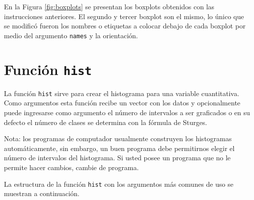 \documentclass[10pt,]{krantz}
\begin{document}
En la Figura \ref{fig:boxplots} se presentan los boxplots obtenidos con
las instrucciones anteriores. El segundo y tercer boxplot son el mismo,
lo único que se modificó fueron los nombres o etiquetas a colocar debajo
de cada boxplot por medio del argumento \texttt{names} y la orientación.

\section{\texorpdfstring{Función
\texttt{hist}}{Función hist}}\label{funcion-hist}

La función \texttt{hist} sirve para crear el histograma
 para una variable cuantitativa. Como
argumentos esta función recibe un vector con los datos y opcionalmente
puede ingresarse como argumento el número de intervalos a ser graficados
o en su defecto el número de clases se determina con la fórmula de
Sturges.

Nota: los programas de computador usualmente construyen los histogramas
automáticamente, sin embargo, un buen programa debe permitirnos elegir
el número de intervalos del histograma. Si usted posee un programa que
no le permite hacer cambios, cambie de programa.

La estructura de la función \texttt{hist} con los argumentos más comunes
de uso se muestran a continuación.
\end{document}
